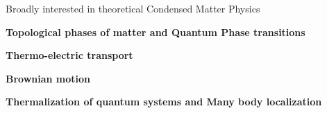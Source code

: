 

\begin{cventries}

  \cventry
    {} %
    {Broadly interested in theoretical Condensed Matter Physics} %
    {} %
    {} %
    {
      \begin{cvitems} %
        \item {\textbf{Topological phases of matter and Quantum Phase transitions}}
        \item {\textbf{Thermo-electric transport}}
        \item {\textbf{Brownian motion}}
        \item {\textbf{Thermalization of quantum systems and Many body localization}}
      \end{cvitems}
    }

\end{cventries}
